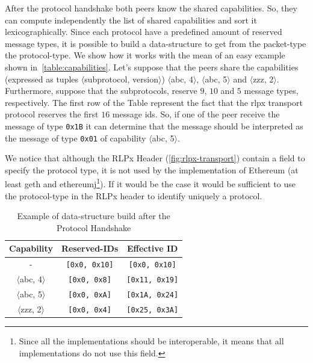 After the protocol handshake both peers know the shared capabilities.
So, they can compute independently the list of shared capabilities and sort
it lexicographically. Since each protocol have a predefined 
amount of reserved message types, it is possible to build a data-structure to 
get from the packet-type the protocol-type. We show how it works with the mean
of an easy example shown in~\autoref{table:capabilities}. Let's suppose that 
the peers share the capabilities (expressed as tuples $\langle$subprotocol, 
version$\rangle$) $\langle$abc, 4$\rangle$, $\langle$abc, 5$\rangle$ and 
$\langle$zzz, 2$\rangle$. Furthermore, suppose that the subprotocols, 
reserve $9$, $10$ and $5$ message types, respectively. The first row of the 
Table represent the fact that the rlpx transport protocol reserves the first 
$16$ message ids. So, if one of the peer receive the message of type 
\texttt{0x1B} it can determine that the message should be interpreted as the
message of type \texttt{0x01} of capability $\langle$abc, 5$\rangle$.

We notice that although the RLPx Header (\autoref{fig:rlpx-transport}) contain
a field to specify the protocol type, it is not used by the implementation
of Ethereum (at least geth and ethereumj\footnote{Since all the implementations 
should be interoperable, it means that all implementations do not use this
field.}). If it would be the case it would be sufficient to use the 
protocol-type in the RLPx header to identify uniquely a protocol.





\begin{table}
    \begin{center}
        \begin{tabular}{c | c | c }
            Capability & Reserved-IDs & Effective ID\\
            \hline
            - & \texttt{[0x0, 0x10]} & \texttt{[0x0, 0x10]} \\
            $\langle$abc, 4$\rangle$ & \texttt{[0x0, 0x8]} & \texttt{[0x11, 0x19]}  \\
            $\langle$abc, 5$\rangle$ & \texttt{[0x0, 0xA]} & \texttt{[0x1A, 0x24]}  \\
            $\langle$zzz, 2$\rangle$ & \texttt{[0x0, 0x4]}  & \texttt{[0x25, 
                0x3A]}
        \end{tabular}
        \caption{Example of data-structure build after the Protocol Handshake}
        \label{table:capabilities}
    \end{center}
\end{table}





